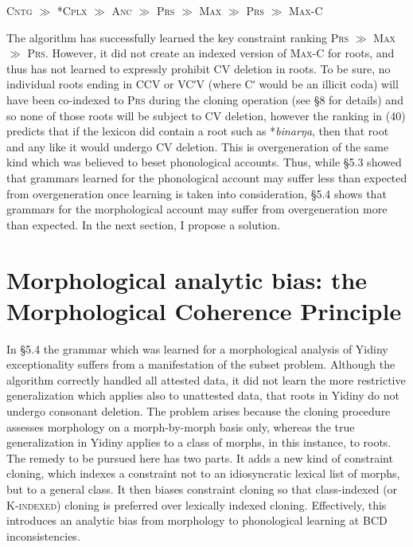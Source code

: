 \documentclass[output=paper,
modfonts
]{LSP/langsci}
\begin{document}
\ea
\textsc{Cntg} \textsc{${\gg}$}\textsc{} \textsc{*Cplx} \textsc{${\gg}$} \textsc{Anc} \textsc{${\gg}$}\textsc{} \textsc{Prs}\textit{} ${\gg}$ \textsc{Max} \textsc{${\gg}$}\textsc{} \textsc{Prs} \textsc{${\gg}$} \textsc{Max-C}
\z

The algorithm has successfully learned the key constraint ranking \textsc{Prs}\textit{} ${\gg}$ \textsc{Max} \textsc{${\gg}$}\textsc{} \textsc{Prs}. However, it did not create an indexed version of \textsc{Max-C} for roots, and thus has not learned to expressly prohibit CV deletion in roots. To be sure, no individual roots ending in CCV or VCʹV (where Cʹ would be an illicit coda) will have been co-indexed to \textsc{Prs}\textit{} during the cloning operation (see §8 for details) and so none of those roots will be subject to CV deletion, however the ranking in (40) predicts that if the lexicon did contain a root such as *\textit{binarŋa}, then that root and any like it would undergo CV deletion. This is overgeneration of the same kind which was believed to beset phonological accounts. Thus, while §5.3 showed that grammars learned for the phonological account may suffer less than expected from overgeneration once learning is taken into consideration, §5.4 shows that grammars for the morphological account may suffer from overgeneration more than expected. In the next section, I propose a solution.

\section[Morphological analytic bias: the Morphological Coherence Principle]{Morphological analytic bias: the Morphological Coherence Principle}
\label{bkm:Ref336973523}\label{bkm:Ref335232765}
In §5.4 the grammar which was learned for a morphological analysis of Yidiny exceptionality suffers from a manifestation of the subset problem. Although the algorithm correctly handled all attested data, it did not learn the more restrictive generalization which applies also to unattested data, that roots in Yidiny do not undergo consonant deletion. The problem arises because the cloning procedure assesses morphology on a morph-by-morph basis only, whereas the true generalization in Yidiny applies to a class of morphs, in this instance, to roots. The remedy to be pursued here has two parts. It adds a new kind of constraint cloning, which indexes a constraint not to an idiosyncratic lexical list of morphs, but to a general class. It then biases constraint cloning so that class-indexed (or \textsc{K-indexed}) cloning is preferred over lexically indexed cloning. Effectively, this introduces an analytic bias \citep{moreton2008r} from morphology to phonological learning at BCD inconsistencies. 
\end{document}
